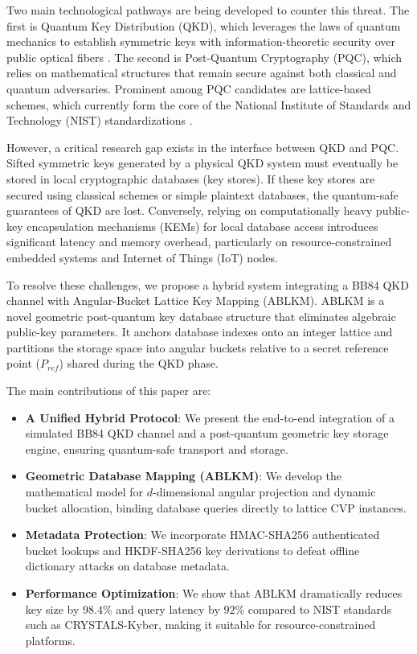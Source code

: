\documentclass[conference,a4paper]{IEEEtran}
\begin{document}
Two main technological pathways are being developed to counter this threat. The first is Quantum Key Distribution (QKD), which leverages the laws of quantum mechanics to establish symmetric keys with information-theoretic security over public optical fibers \cite{bb84}. The second is Post-Quantum Cryptography (PQC), which relies on mathematical structures that remain secure against both classical and quantum adversaries. Prominent among PQC candidates are lattice-based schemes, which currently form the core of the National Institute of Standards and Technology (NIST) standardizations \cite{nist}.

However, a critical research gap exists in the interface between QKD and PQC. Sifted symmetric keys generated by a physical QKD system must eventually be stored in local cryptographic databases (key stores). If these key stores are secured using classical schemes or simple plaintext databases, the quantum-safe guarantees of QKD are lost. Conversely, relying on computationally heavy public-key encapsulation mechanisms (KEMs) for local database access introduces significant latency and memory overhead, particularly on resource-constrained embedded systems and Internet of Things (IoT) nodes.

To resolve these challenges, we propose a hybrid system integrating a BB84 QKD channel with Angular-Bucket Lattice Key Mapping (ABLKM). ABLKM is a novel geometric post-quantum key database structure that eliminates algebraic public-key parameters. It anchors database indexes onto an integer lattice and partitions the storage space into angular buckets relative to a secret reference point ($P_{ref}$) shared during the QKD phase.

The main contributions of this paper are:
\begin{itemize}
    \item \textbf{A Unified Hybrid Protocol}: We present the end-to-end integration of a simulated BB84 QKD channel and a post-quantum geometric key storage engine, ensuring quantum-safe transport and storage.
    \item \textbf{Geometric Database Mapping (ABLKM)}: We develop the mathematical model for $d$-dimensional angular projection and dynamic bucket allocation, binding database queries directly to lattice CVP instances.
    \item \textbf{Metadata Protection}: We incorporate HMAC-SHA256 authenticated bucket lookups and HKDF-SHA256 key derivations to defeat offline dictionary attacks on database metadata.
    \item \textbf{Performance Optimization}: We show that ABLKM dramatically reduces key size by $98.4\%$ and query latency by $92\%$ compared to NIST standards such as CRYSTALS-Kyber, making it suitable for resource-constrained platforms.
\end{itemize}
\end{document}
